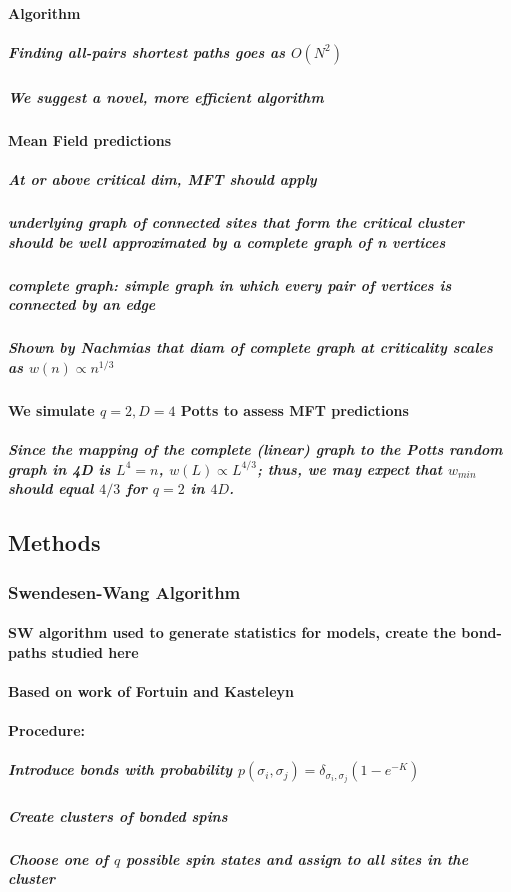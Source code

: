 \documentclass[pre,preprint]{revtex4-1}
\begin{document}
\paragraph{Algorithm}
\label{sec-1.1.3.4}
\subparagraph{Finding all-pairs shortest paths goes as $O(N^2)$}
\label{sec-1.1.3.4.1}
\subparagraph{We suggest a novel, more efficient algorithm}
\label{sec-1.1.3.4.2}
\paragraph{Mean Field predictions}
\label{sec-1.1.3.5}
\subparagraph{At or above critical dim, MFT should apply}
\label{sec-1.1.3.5.1}
\subparagraph{underlying graph of connected sites that form the critical cluster should be well approximated by a complete graph of n vertices}
\label{sec-1.1.3.5.2}
\subparagraph{complete graph:  simple graph in which every pair of vertices is connected by an edge}
\label{sec-1.1.3.5.3}
\subparagraph{Shown by Nachmias \cite{Nachmiasa} that diam of complete graph at criticality scales as $w(n) \propto n^{1/3}$}
\label{sec-1.1.3.5.4}
\paragraph{We simulate $q=2, D=4$ Potts to assess MFT predictions}
\label{sec-1.1.3.6}
\subparagraph{Since the mapping of the complete (linear) graph to the Potts random graph in 4D is $L^4=n$, $w(L) \propto L^{4/3}$; thus, we may expect that $w_{min}$ should equal $4/3$ for $q=2$ in $4D$.}
\label{sec-1.1.3.6.1}
\subsection{Methods}
\label{sec-1.2}
\subsubsection{Swendesen-Wang Algorithm}
\label{sec-1.2.1}
\paragraph{SW algorithm \cite{SwWA} used to generate statistics for models, create the bond-paths studied here}
\label{sec-1.2.1.1}
\paragraph{Based on work of Fortuin and Kasteleyn \cite{FoKa}}
\label{sec-1.2.1.2}
\paragraph{Procedure:}
\label{sec-1.2.1.3}
\subparagraph{Introduce bonds with probability $p(\sigma_i,\sigma_j) = \delta_{\sigma_i, \sigma_j} (1-e^{-K})$}
\label{sec-1.2.1.3.1}
\subparagraph{Create clusters of bonded spins}
\label{sec-1.2.1.3.2}
\subparagraph{Choose one of $q$ possible spin states and assign to all sites in the cluster}
\label{sec-1.2.1.3.3}
\end{document}
